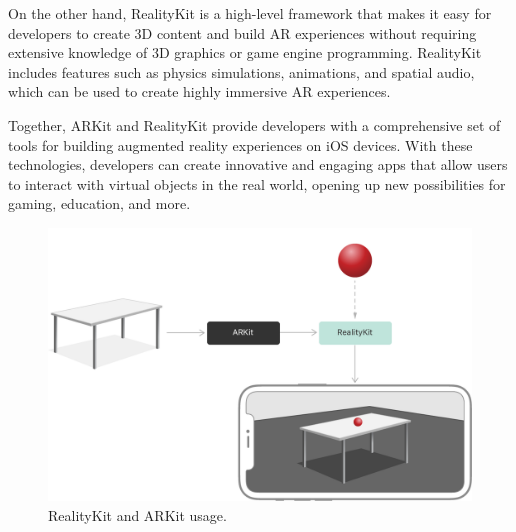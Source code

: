 On the other hand, RealityKit is a high-level framework that makes it easy for developers to create 3D content and build AR experiences without requiring extensive knowledge of 3D graphics or game engine programming. RealityKit includes features such as physics simulations, animations, and spatial audio, which can be used to create highly immersive AR experiences.

Together, ARKit and RealityKit provide developers with a comprehensive set of tools for building augmented reality experiences on iOS devices. With these technologies, developers can create innovative and engaging apps that allow users to interact with virtual objects in the real world, opening up new possibilities for gaming, education, and more.

\begin{figure}[!ht]
    \centering
    \includegraphics[width=150mm]{../images/realitykit.png}
    \caption{RealityKit and ARKit usage.}
    \label{fig:TexnicCenter}
\end{figure}



